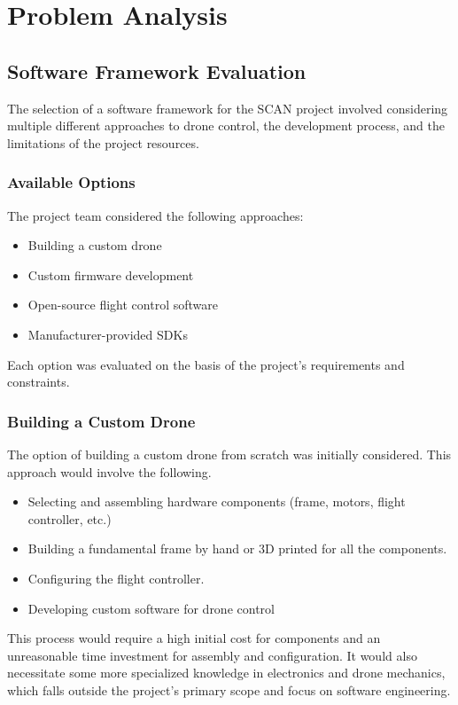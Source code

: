 \chapter{Problem Analysis}

\section{Software Framework Evaluation}
The selection of a software framework for the SCAN project involved considering multiple different approaches to drone control, the development process, and the limitations of the project resources. 

\subsection{Available Options}
The project team considered the following approaches:

\begin{itemize}
    \item Building a custom drone
    \item Custom firmware development
    \item Open-source flight control software
    \item Manufacturer-provided SDKs
\end{itemize}

Each option was evaluated on the basis of the project's requirements and constraints.

\subsection{Building a Custom Drone}
The option of building a custom drone from scratch was initially considered. This approach would involve the following.

\begin{itemize}
    \item Selecting and assembling hardware components (frame, motors, flight controller, etc.)
    \item Building a fundamental frame by hand or 3D printed for all the components.
    \item Configuring the flight controller.
    \item Developing custom software for drone control
\end{itemize}

This process would require a high initial cost for components and an unreasonable time investment for assembly and configuration. It would also necessitate some more specialized knowledge in electronics and drone mechanics, which falls outside the project's primary scope and focus on software engineering. 

